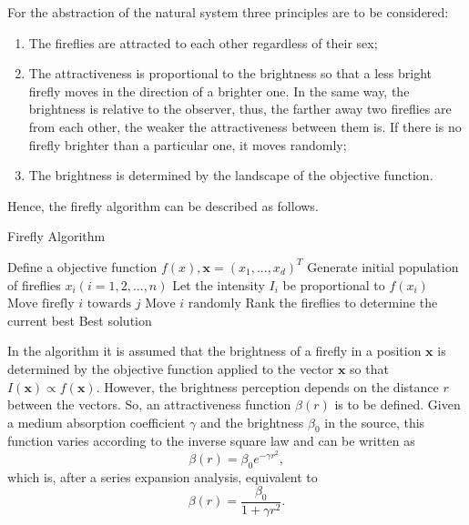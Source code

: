 \documentclass[tuberlin,cic,tc,openright,english,noabntcite,oneside]{iiufrgs}
\begin{document}
For the abstraction of the natural system three principles are to be considered:
\begin{enumerate}
	\item The fireflies are attracted to each other regardless of their sex;
	\item The attractiveness is proportional to the brightness so that a less bright firefly moves in the direction of a brighter one. In the same way, the brightness is relative to the observer, thus, the farther away two fireflies are from each other, the weaker the attractiveness between them is. If there is no firefly brighter than a particular one, it moves randomly;
	\item The brightness is determined by the landscape of the objective function.
\end{enumerate}

Hence, the firefly algorithm can be described as follows.
\begin{algorithm}[H]
\caption{Firefly Algorithm}
\begin{algorithmic}
\State Define a objective function $f(x), \mathbf{x}=(x_{1},...,x_{d})^{T}$
\State Generate initial population of fireflies $x_{i}(i=1,2,...,n)$
\State Let the intensity $I_{i}$ be proportional to $f(x_{i})$
				\State $\text{Move firefly }i\text{ towards }j$
			\EndIf
		\EndFor
	\EndFor
		\State $\text{Move }i\text{ randomly}$
	\EndIf
	\State Rank the fireflies to determine the current best
\EndWhile
\State \Return Best solution
\EndFunction
\end{algorithmic}
\end{algorithm}

In the algorithm it is assumed that the brightness of a firefly in a position $\mathbf{x}$ is determined by the objective function applied to the vector $\mathbf{x}$ so that $I(\mathbf{x}) \propto f(\mathbf{x})$. However, the brightness perception depends on the distance $r$ between the vectors. So, an attractiveness function $\beta(r)$ is to be defined. Given a medium absorption coefficient $\gamma$ and the brightness $\beta_{0}$ in the source, this function varies according to the inverse square law and can be written as
$$\beta(r) = \beta_{0}e^{-\gamma r^{2}},$$ which is, after a series expansion analysis, equivalent to
$$\beta(r) = \frac{\beta_{0}}{1 + \gamma r^{2}}.$$
\end{document}
